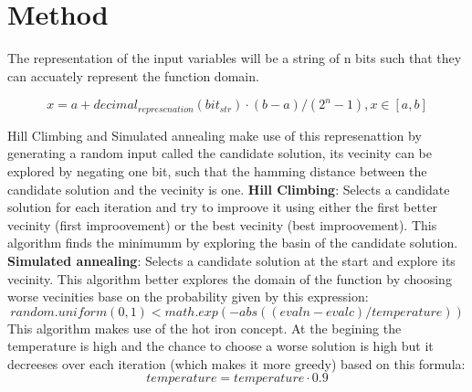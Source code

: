 \documentclass{report}
\begin{document}
\section*{Method}

The representation of the input variables will be a string of n bits such that they can accuately represent the function domain.

$$x = a + decimal_{represenation}(bit_{str}) \cdot (b - a)/(2^n - 1) ,  x \in \left[a, b \right]$$

Hill Climbing and Simulated annealing make use of this represenattion by generating a random input called the candidate solution, its vecinity can be explored by negating one bit, such that the hamming distance between the candidate solution and the vecinity is one.
\newline
\newline
\textbf{Hill Climbing}:
\newline
\newline
Selects a candidate solution for each iteration and try to improove it using either the first better vecinity (first improovement) or the best vecinity (best improovement). 
This algorithm finds the minimumm by exploring the basin of the candidate solution.
\newline
\newline
\textbf{Simulated annealing}:
\newline
\newline
Selects a candidate solution at the start and explore its vecinity. This algorithm better explores the domain of the function by choosing worse vecinities base on the probability given by this expression:
\newline
$$random.uniform(0, 1) < math.exp(-abs((evaln - evalc) / temperature))$$
\newline
This algorithm makes use of the hot iron concept. At the begining the temperature  is high and the chance to choose a worse solution is high but it decreeses over each iteration 
(which makes it more greedy)  based on this formula:
\newline
$$temperature = temperature \cdot 0.9$$

\pagebreak
\end{document}
